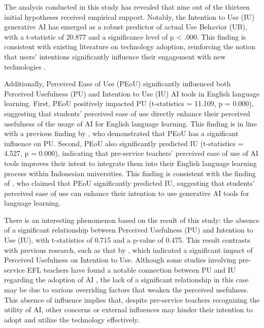\documentclass[english]{textolivre}
\begin{document}
The analysis conducted in this study has revealed that nine out of the thirteen initial hypotheses received empirical support. Notably, the Intention to Use (IU) generative AI has emerged as a robust predictor of actual Use Behavior (UB), with a t-statistic of 20.877 and a significance level of p < .000. This finding is consistent with existing literature on technology adoption, reinforcing the notion that users’ intentions significantly influence their engagement with new technologies \cite{AyyoubEtAl2025GenAIUTAUT,KaranChakma2025AIAcceptance}.

Additionally, Perceived Ease of Use (PEoU) significantly influenced both Perceived Usefulness (PU) and Intention to Use (IU) AI tools in English language learning. First, PEoU positively impacted PU (t-statistics = 11.109, p = 0.000), suggesting that students’ perceived ease of use directly enhance their perceived usefulness of the usage of AI for English language learning. This finding is in line with a previous finding by \textcite{SetyaningsihEtAl2025ChatGPTEditing}, who demonstrated that PEoU has a significant influence on PU. Second, PEoU also significantly predicted IU (t-statistics = 4.527, p = 0.000), indicating that pre-service teachers’ perceived ease of use of AI tools improves their intent to integrate them into their English language learning process within Indonesian universities. This finding is consistent with the finding of \textcite{ArifSulistiyoWachyunni2024SelfDirectedICT}, who claimed that PEoU significantly predicted IU, suggesting that students’ perceived ease of use can enhance their intention to use generative AI tools for language learning.

There is an interesting phenomenon based on the result of this study: the absence of a significant relationship between Perceived Usefulness (PU) and Intention to Use (IU), with t-statistics of 0.715 and a p-value of 0.475. This result contrasts with previous research, such as that by \textcite{MustofaEtAl2025ExtendedTAMAI}, which indicated a significant impact of Perceived Usefulness on Intention to Use. Although some studies involving pre-service EFL teachers have found a notable connection between PU and IU regarding the adoption of AI \cite{KaranChakma2025AIAcceptance,LiuMa2024ChatGPTTAM}, the lack of a significant relationship in this case may be due to various overriding factors that weaken the perceived usefulness. This absence of influence implies that, despite pre-service teachers recognizing the utility of AI, other concerns or external influences may hinder their intention to adopt and utilize the technology effectively.
\end{document}
